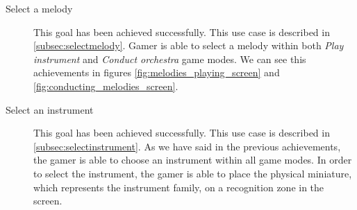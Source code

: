 \begin{description}
\item[Select a melody]
This goal has been achieved successfully. This use case is described in \ref{subsec:selectmelody}. Gamer is able to select a melody within both \textit{Play instrument} and \textit{Conduct orchestra} game modes.  We can see this achievements in figures \ref{fig:melodies_playing_screen} and \ref{fig:conducting_melodies_screen}.

\item[Select an instrument]
This goal has been achieved successfully. This use case is described in \ref{subsec:selectinstrument}. As we have said in the previous achievements, the gamer is able to choose an instrument within all game modes. In order to select the instrument, the gamer is able to place the physical miniature, which represents the instrument family, on a recognition zone in the screen.

\end{description}
